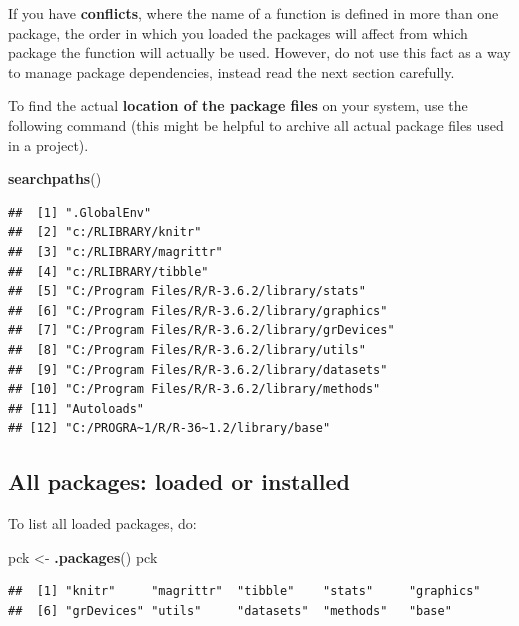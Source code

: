 \documentclass[]{book}
\newenvironment{Shaded}{\begin{snugshade}}{\end{snugshade}}
\newcommand{\KeywordTok}[1]{\textcolor[rgb]{0.13,0.29,0.53}{\textbf{#1}}}
\newcommand{\NormalTok}[1]{#1}
\newcommand{\StringTok}[1]{\textcolor[rgb]{0.31,0.60,0.02}{#1}}
\begin{document}
If you have \textbf{conflicts}, where the name of a function is defined in more than one package, the order in which you loaded the packages will affect from which package the function will actually be used. However, do not use this fact as a way to manage package dependencies, instead read the next section carefully.

To find the actual \textbf{location of the package files} on your system, use the following command (this might be helpful to archive all actual package files used in a project).

\begin{Shaded}
\begin{Highlighting}[]
\KeywordTok{searchpaths}\NormalTok{()}
\end{Highlighting}
\end{Shaded}

\begin{verbatim}
##  [1] ".GlobalEnv"                                  
##  [2] "c:/RLIBRARY/knitr"                           
##  [3] "c:/RLIBRARY/magrittr"                        
##  [4] "c:/RLIBRARY/tibble"                          
##  [5] "C:/Program Files/R/R-3.6.2/library/stats"    
##  [6] "C:/Program Files/R/R-3.6.2/library/graphics" 
##  [7] "C:/Program Files/R/R-3.6.2/library/grDevices"
##  [8] "C:/Program Files/R/R-3.6.2/library/utils"    
##  [9] "C:/Program Files/R/R-3.6.2/library/datasets" 
## [10] "C:/Program Files/R/R-3.6.2/library/methods"  
## [11] "Autoloads"                                   
## [12] "C:/PROGRA~1/R/R-36~1.2/library/base"
\end{verbatim}

\hypertarget{all-packages-loaded-or-installed}{%
\subsection{All packages: loaded or installed}\label{all-packages-loaded-or-installed}}

To list all loaded packages, do:

\begin{Shaded}
\begin{Highlighting}[]
\NormalTok{pck <-}\StringTok{ }\KeywordTok{.packages}\NormalTok{()}
\NormalTok{pck}
\end{Highlighting}
\end{Shaded}

\begin{verbatim}
##  [1] "knitr"     "magrittr"  "tibble"    "stats"     "graphics" 
##  [6] "grDevices" "utils"     "datasets"  "methods"   "base"
\end{verbatim}
\end{document}
